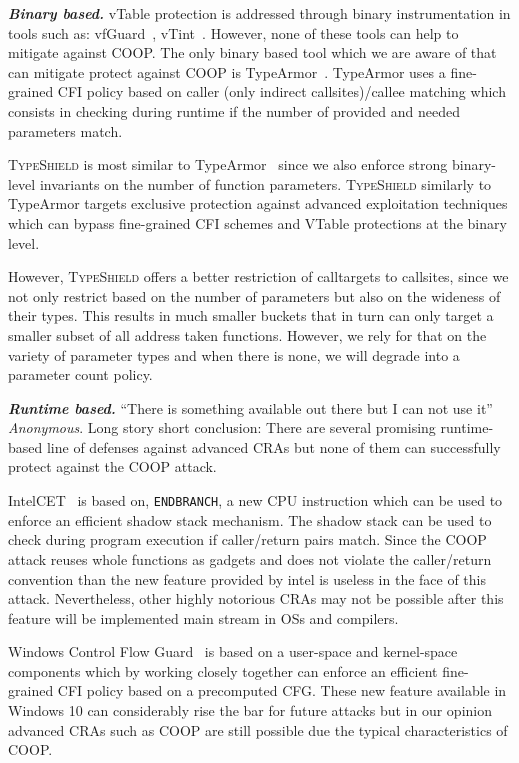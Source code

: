 \textbf{\textit{Binary based.}} vTable protection is addressed through binary instrumentation in tools
such as: vfGuard~\cite{vfuard:aravind}, vTint~\cite{vtint:zhang}. However, none of these tools can
help to mitigate against COOP. The only binary based tool which we are aware of that
can mitigate protect against COOP is TypeArmor~\cite{veen:typearmor}.  
TypeArmor uses a fine-grained CFI policy based on caller (only indirect callsites)/callee matching 
which consists in checking during runtime if the number of provided and needed parameters match.

\textsc{TypeShield} is most similar to TypeArmor~\cite{veen:typearmor} since
we also enforce strong binary-level invariants on the number of function
parameters. \textsc{TypeShield} similarly to TypeArmor targets 
exclusive protection against advanced exploitation techniques 
which can bypass fine-grained CFI schemes and VTable protections at the binary level.

However, \textsc{TypeShield} offers a better restriction of calltargets to callsites, since 
we not only restrict based on the number of parameters but also on the wideness of their types. 
This results in much smaller buckets that in turn can only target a smaller subset of all address
taken functions. However, we rely for that on the variety of parameter types and when there is 
none, we will degrade into a parameter count policy.

\textbf{\textit{Runtime based.}}
``There is something available out there but I can not use it'' \textit{Anonymous}.
Long story short conclusion: There are several promising runtime-based line of defenses against
advanced CRAs but none of them can successfully protect against the COOP attack.

IntelCET~\cite{intel:cet} is based on, \texttt{ENDBRANCH}, a new CPU instruction which can be used to enforce
an efficient shadow stack mechanism. The shadow stack can be used to check during program execution if caller/return pairs match.
Since the COOP attack reuses whole functions as gadgets and does not violate the caller/return convention than the 
new feature provided by intel is useless in the face of this attack. Nevertheless, other highly notorious CRAs may not be possible
after this feature will be implemented main stream in OSs and compilers.

Windows Control Flow Guard~\cite{windows:cfguard} is based on a user-space and kernel-space components which
by working closely together can enforce an efficient fine-grained CFI policy based on a precomputed CFG.
These new feature available in Windows 10 can considerably rise the bar for future attacks but in our opinion advanced CRAs
such as COOP are still possible due the typical characteristics of COOP.


